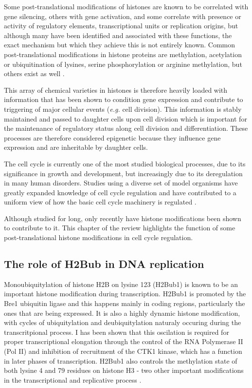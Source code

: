 \documentclass[11pt,twoside,a4paper]{report}
\begin{document}
	Some post-translational modifications of histones are known to be correlated with gene silencing, others with gene activation, and some correlate with presence or activity of regulatory elements, transcriptional units or replication origins, but although many have been identified and associated with these functions, the exact mechanism but which they achieve this is not entirely known. Common post-translational modifications in histone proteins are methylation, acetylation or ubiquitination of lysines, serine phosphorylation or arginine methylation, but others exist as well  \cite{Strahl2000a} \cite{Kouzarides2007} \cite{Bannister2011}.
	 
	This array of chemical varieties in histones is therefore heavily loaded with information that has been shown to condition gene expression and contribute to triggering of major cellular events (\textit{e.g.} cell division). This information is stably maintained and passed to daughter cells upon cell division which is important for the maintenance of regulatory status along cell division and differentiation. These processes are therefore considered epigenetic because they influence gene expression and are inheritable by daughter cells.
		
	The cell cycle is currently one of the most studied biological processes, due to its significance in growth and development, but increasingly due to its deregulation in many human disorders. Studies using a diverse set of model organisms have greatly expanded knowledge of cell cycle regulation and have contributed to a uniform view of how the basic cell cycle machinery is regulated  \cite{Raynaud2014a}.
	
	Although studied for long, only recently have histone modifications been shown to contribute to it. This chapter of the review highlights the function of some post-translational histone modifications in cell cycle regulation.
		
		\subsection{The role of H2Bub in DNA replication}
		Monoubiquitylation of histone H2B on lysine 123 (H2Bub1) is known to be an important histone modification during transcription. H2Bub1 is promoted by the Bre1 ubiquitin ligase and this happens mainly in coding regions, particularly the ones that are being expressed. It is also a highly dynamic histone modification, with cycles of ubiquitylation and deubiquitylation naturaly occuring during the transcritpional process. I has been shown that this oscilation is required for proper transcriptional elongation through the control of the RNA Polymerase II (Pol II) and inhibition of recruitment of the CTK1 kinase, which has a function in later phases of transcription. H2Bub1 also controls the methylation state of both lysine 4 and 79 residues on histone H3 - two other important modifications in the transcriptional and replicative process \cite{Kouzarides2007}.
		
\end{document}
